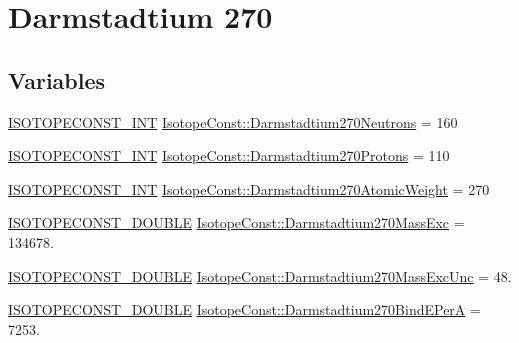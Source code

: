 \hypertarget{group___isotope_const-_darmstadtium-_ds270}{}\section{Darmstadtium 270}
\label{group___isotope_const-_darmstadtium-_ds270}
\subsection*{Variables}
\begin{DoxyCompactItemize}
\item 
\mbox{\hyperlink{group___isotope_const-_macros_ga5f18360b3e99483a35c32d789e62621c}{I\+S\+O\+T\+O\+P\+E\+C\+O\+N\+S\+T\+\_\+\+I\+NT}} \mbox{\hyperlink{group___isotope_const-_darmstadtium-_ds270_ga4175ebf0ad5c97b9eb9c9d5c87de3200}{Isotope\+Const\+::\+Darmstadtium270\+Neutrons}} = 160
\item 
\mbox{\hyperlink{group___isotope_const-_macros_ga5f18360b3e99483a35c32d789e62621c}{I\+S\+O\+T\+O\+P\+E\+C\+O\+N\+S\+T\+\_\+\+I\+NT}} \mbox{\hyperlink{group___isotope_const-_darmstadtium-_ds270_ga899ed60f5cc8017885c1816317bec3c3}{Isotope\+Const\+::\+Darmstadtium270\+Protons}} = 110
\item 
\mbox{\hyperlink{group___isotope_const-_macros_ga5f18360b3e99483a35c32d789e62621c}{I\+S\+O\+T\+O\+P\+E\+C\+O\+N\+S\+T\+\_\+\+I\+NT}} \mbox{\hyperlink{group___isotope_const-_darmstadtium-_ds270_gaeb406de6d73370e3ecf1b20b36c41d8c}{Isotope\+Const\+::\+Darmstadtium270\+Atomic\+Weight}} = 270
\item 
\mbox{\hyperlink{group___isotope_const-_macros_ga8f45a7272ce02c0b4c65c44636ed719a}{I\+S\+O\+T\+O\+P\+E\+C\+O\+N\+S\+T\+\_\+\+D\+O\+U\+B\+LE}} \mbox{\hyperlink{group___isotope_const-_darmstadtium-_ds270_ga69c8e19290d2d5818412adf63393b531}{Isotope\+Const\+::\+Darmstadtium270\+Mass\+Exc}} = 134678.
\item 
\mbox{\hyperlink{group___isotope_const-_macros_ga8f45a7272ce02c0b4c65c44636ed719a}{I\+S\+O\+T\+O\+P\+E\+C\+O\+N\+S\+T\+\_\+\+D\+O\+U\+B\+LE}} \mbox{\hyperlink{group___isotope_const-_darmstadtium-_ds270_gaa58c0b0fea5522f1e561f9f21b9782e2}{Isotope\+Const\+::\+Darmstadtium270\+Mass\+Exc\+Unc}} = 48.
\item 
\mbox{\hyperlink{group___isotope_const-_macros_ga8f45a7272ce02c0b4c65c44636ed719a}{I\+S\+O\+T\+O\+P\+E\+C\+O\+N\+S\+T\+\_\+\+D\+O\+U\+B\+LE}} \mbox{\hyperlink{group___isotope_const-_darmstadtium-_ds270_ga3c6fa8243953815fd022b67f8656f268}{Isotope\+Const\+::\+Darmstadtium270\+Bind\+E\+PerA}} = 7253.

\end{DoxyCompactItemize}
